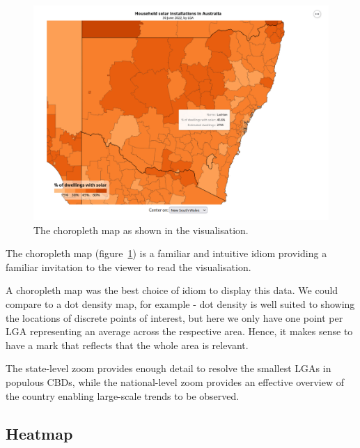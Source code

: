 \documentclass[12pt,letterpaper]{article}
\begin{document}
\begin{multicols}{2}
    \begin{figure}[H]
        \centering
        \includegraphics[width=\linewidth]{images/map.png}
        \caption{The choropleth map as shown in the visualisation.}
        \label{fig:map}
    \end{figure}

    The choropleth map (figure~\ref{fig:map}) is a familiar and intuitive idiom providing a familiar invitation to the viewer to read the visualisation.

    A choropleth map was the best choice of idiom to display this data. We could compare to a dot density map, for example - dot density is well suited to showing the locations of discrete points of interest, but here we only have one point per LGA representing an average across the respective area. Hence, it makes sense to have a mark that reflects that the whole area is relevant.

    The state-level zoom provides enough detail to resolve the smallest LGAs in populous CBDs, while the national-level zoom provides an effective overview of the country enabling large-scale trends to be observed.

    \subsection*{Heatmap}


\end{multicols}
\end{document}
